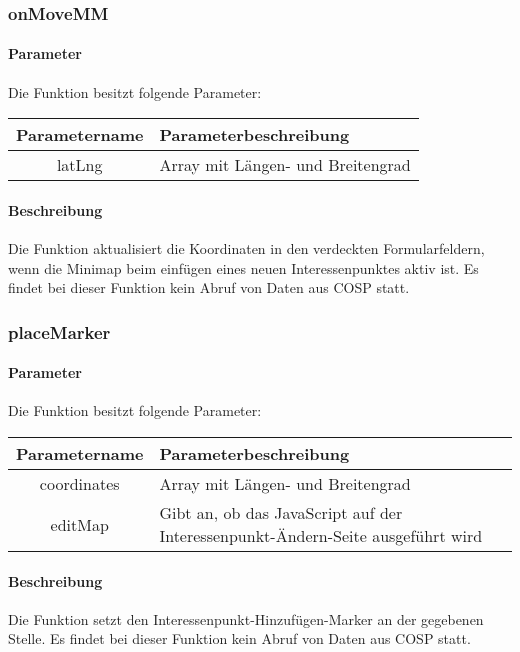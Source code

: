 \subsubsection{onMoveMM}
\paragraph{Parameter} Die Funktion besitzt folgende Parameter:
\begin{table}[H]
	\begin{tabular}{|c|p{11cm}|}
		\hline
		\textbf{Parametername} & \textbf{Parameterbeschreibung} \\ \hline
		latLng & Array mit Längen- und Breitengrad \\ \hline
	\end{tabular}
\end{table}
\paragraph{Beschreibung} Die Funktion aktualisiert die Koordinaten in den verdeckten Formularfeldern, wenn die Minimap beim einfügen eines neuen Interessenpunktes aktiv ist. Es findet bei dieser Funktion kein Abruf von Daten aus {\glqq COSP\grqq} statt.
\subsubsection{placeMarker}
\paragraph{Parameter} Die Funktion besitzt folgende Parameter:
\begin{table}[H]
	\begin{tabular}{|c|p{11cm}|}
		\hline
		\textbf{Parametername} & \textbf{Parameterbeschreibung} \\ \hline
		coordinates & Array mit Längen- und Breitengrad \\ \hline
		editMap     & Gibt an, ob das JavaScript auf der Interessenpunkt-Ändern-Seite ausgeführt wird \\ \hline
	\end{tabular}
\end{table}
\paragraph{Beschreibung} Die Funktion setzt den Interessenpunkt-Hinzufügen-Marker an der gegebenen Stelle. Es findet bei dieser Funktion kein Abruf von Daten aus {\glqq COSP\grqq} statt.
